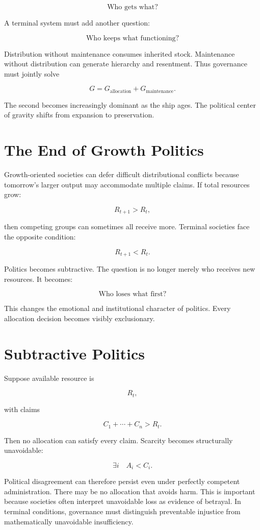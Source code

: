 \documentclass[11pt,oneside]{book}
\theoremstyle{definition}
\theoremstyle{remark}
\begin{document}
\[
\text{Who gets what?}
\]

A terminal system must add another question:

\[
\text{Who keeps what functioning?}
\]

Distribution without maintenance consumes inherited stock. Maintenance without distribution can
generate hierarchy and resentment. Thus governance must jointly solve

\[
G = G_{\mathrm{allocation}} + G_{\mathrm{maintenance}}.
\]

The second becomes increasingly dominant as the ship ages. The political center of gravity shifts
from expansion to preservation.

\section{The End of Growth Politics}

Growth-oriented societies can defer difficult distributional conflicts because tomorrow's larger
output may accommodate multiple claims. If total resources grow:

\[
R_{t+1}>R_t,
\]

then competing groups can sometimes all receive more. Terminal societies face the opposite
condition:

\[
R_{t+1}<R_t.
\]

Politics becomes subtractive. The question is no longer merely who receives new resources. It
becomes:

\[
\text{Who loses what first?}
\]

This changes the emotional and institutional character of politics. Every allocation decision
becomes visibly exclusionary.

\section{Subtractive Politics}

Suppose available resource is

\[
R_t,
\]

with claims

\[
C_1+\cdots+C_n>R_t.
\]

Then no allocation can satisfy every claim. Scarcity becomes structurally unavoidable:

\[
\exists i \quad A_i<C_i.
\]

Political disagreement can therefore persist even under perfectly competent administration. There
may be no allocation that avoids harm. This is important because societies often interpret
unavoidable loss as evidence of betrayal. In terminal conditions, governance must distinguish
preventable injustice from mathematically unavoidable insufficiency.
\end{document}

